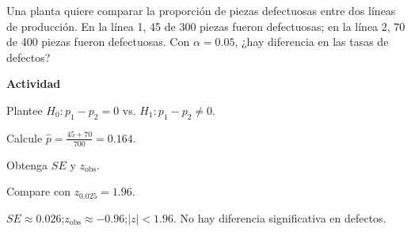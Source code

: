 \begin{ejercicio}
Una planta quiere comparar la proporción de piezas defectuosas entre dos líneas de producción.
En la línea 1, 45 de 300 piezas fueron defectuosas;
en la línea 2, 70 de 400 piezas fueron defectuosas.
Con $\alpha=0.05$, ¿hay diferencia en las tasas de defectos?


\textbf{Actividad}
\begin{pasos}
  \item Plantee $H_0:p_1-p_2=0$ vs. $H_1:p_1-p_2\neq 0$.
  \item Calcule $\hat{p}=\tfrac{45+70}{700}=0.164$.
  \item Obtenga $SE$ y $z_{\text{obs}}$.
  \item Compare con $z_{0.025}=1.96$.
\end{pasos}

\begin{clave}
$SE\approx 0.026$;\quad $z_{\text{obs}}\approx -0.96$;\quad $|z|<1.96$.
No hay diferencia significativa en defectos.
\end{clave}
\end{ejercicio}


